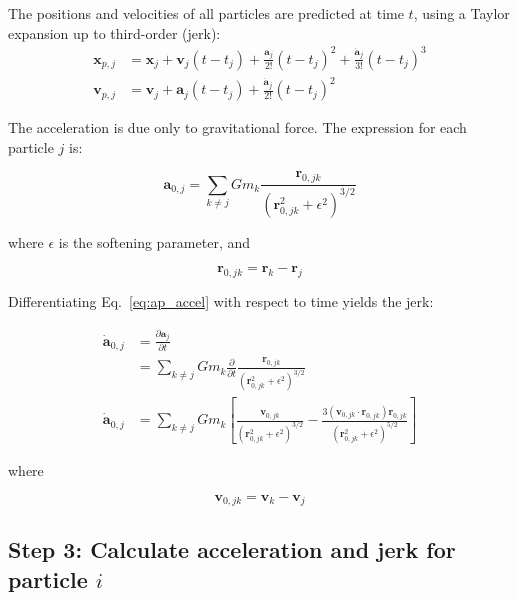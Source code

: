 \begin{appendixs}
	The positions and velocities of all particles are predicted at time $t$, using a Taylor expansion up to third-order (jerk):
	\begin{align}
		\mathbf{x}_{p, j} &= \mathbf{x}_j + \mathbf{v}_j (t - t_j) + \frac{\mathbf{a}_j}{2!} (t - t_j)^2 + \frac{\dot{\mathbf{a}}_j}{3!} (t - t_j)^3 \label{eq:ap_xpred} \\
		\mathbf{v}_{p, j} &= \mathbf{v}_j + \mathbf{a}_j (t - t_j) + \frac{\dot{\mathbf{a}}_j}{2!} (t - t_j)^2
	\end{align}
	
	The acceleration is due only to gravitational force. The expression for each particle $j$ is:
	
	\begin{equation}
		\mathbf{a}_{0, j} = \sum_{k \neq j} G m_k \frac{\mathbf{r}_{0,jk}}{(\mathbf{r}_{0,jk}^2 + \epsilon^2)^{3/2}} \label{eq:ap_accel}
	\end{equation}
	
	where $\epsilon$ is the softening parameter, and
	
	\begin{equation}
		\mathbf{r}_{0,jk} = \mathbf{r}_{k} - \mathbf{r}_{j}
	\end{equation}
	
	Differentiating Eq.~\eqref{eq:ap_accel} with respect to time yields the jerk:
	
	\begin{align}
		\dot{\mathbf{a}}_{0, j} &= \frac{\partial \mathbf{a}_j}{\partial t} \\
		&= \sum_{k \neq j} G m_k \frac{\partial}{\partial t}\frac{\mathbf{r}_{0,jk}}{(\mathbf{r}_{0,jk}^2 + \epsilon^2)^{3/2}} \\
		\dot{\mathbf{a}}_{0, j} &= \sum_{k \neq j} G m_k \left[\frac{\mathbf{v}_{0,jk}}{(\mathbf{r}_{0,jk}^2 + \epsilon^2)^{3/2}} - \frac{3(\mathbf{v}_{0,jk} \cdot \mathbf{r}_{0,jk})\mathbf{r}_{0,jk}}{(\mathbf{r}_{0,jk}^2 + \epsilon^2)^{5/2}}\right] \label{eq:ap_jerk}
	\end{align}
	
	where
	
	\begin{equation}
		\mathbf{v}_{0,jk} = \mathbf{v}_{k} - \mathbf{v}_{j}
	\end{equation}
	
	\subsection{Step 3: Calculate acceleration and jerk for particle $i$}
	

\end{appendixs}
